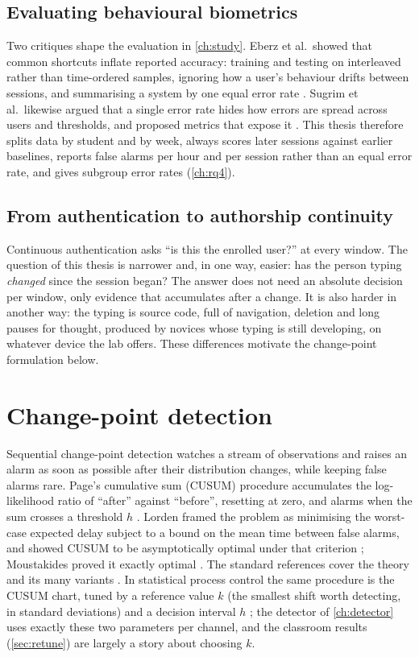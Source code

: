 \subsection{Evaluating behavioural biometrics}
Two critiques shape the evaluation in \cref{ch:study}. Eberz et al.\ showed
that common shortcuts inflate reported accuracy: training and testing on
interleaved rather than time-ordered samples, ignoring how a user's behaviour
drifts between sessions, and summarising a system by one equal error rate
\cite{eberz2017evaluating}. Sugrim et al.\ likewise argued that a single
error rate hides how errors are spread across users and thresholds, and
proposed metrics that expose it \cite{sugrim2019metrics}. This thesis
therefore splits data by student and by week, always scores later sessions
against earlier baselines, reports false alarms per hour and per session
rather than an equal error rate, and gives subgroup error rates (\cref{ch:rq4}).

\subsection{From authentication to authorship continuity}
Continuous authentication asks ``is this the enrolled user?'' at every
window. The question of this thesis is narrower and, in one way, easier: has
the person typing \emph{changed} since the session began? The answer does not
need an absolute decision per window, only evidence that accumulates after a
change. It is also harder in another way: the typing is source code, full of
navigation, deletion and long pauses for thought, produced by novices whose
typing is still developing, on whatever device the lab offers. These
differences motivate the change-point formulation below.

\section{Change-point detection}
\label{sec:rw-changepoint}
Sequential change-point detection watches a stream of observations and raises
an alarm as soon as possible after their distribution changes, while keeping
false alarms rare. Page's cumulative sum (CUSUM) procedure accumulates the
log-likelihood ratio of ``after'' against ``before'', resetting at zero, and
alarms when the sum crosses a threshold $h$ \cite{page1954continuous}. Lorden
framed the problem as minimising the worst-case expected delay subject to a
bound on the mean time between false alarms, and showed CUSUM to be
asymptotically optimal under that criterion \cite{lorden1971procedures};
Moustakides proved it exactly optimal \cite{moustakides1986optimal}. The
standard references cover the theory and its many variants
\cite{basseville1993detection,tartakovsky2014sequential}. In statistical process
control the same procedure is the CUSUM chart, tuned by a reference value $k$
(the smallest shift worth detecting, in standard deviations) and a decision
interval $h$ \cite{hawkins1998cusum}; the detector of \cref{ch:detector} uses
exactly these two parameters per channel, and the classroom results
(\cref{sec:retune}) are largely a story about choosing $k$.

